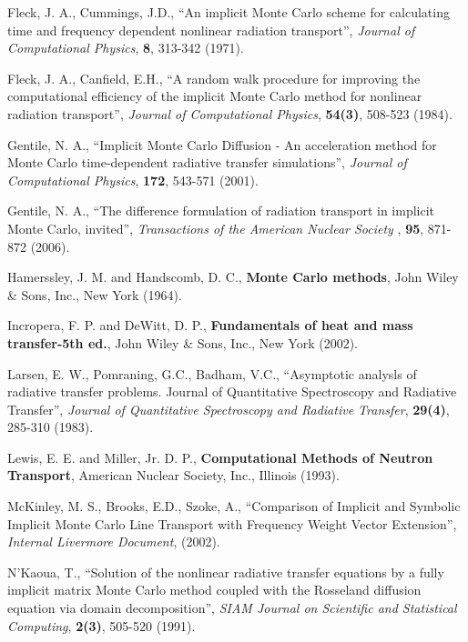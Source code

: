 \begin{thebibliography}{Wac 75}
 Fleck, J. A., Cummings, J.D., ``An implicit Monte Carlo scheme for calculating time and frequency dependent nonlinear radiation transport'',  \emph{Journal of Computational Physics}, \textbf{8}, 313-342 (1971).

 Fleck, J. A., Canfield, E.H., ``A random walk procedure for improving the computational efficiency of the implicit Monte Carlo method for nonlinear radiation transport'', \emph{Journal of Computational Physics}, \textbf{54(3)}, 508-523 (1984).
	

 Gentile, N. A., ``Implicit Monte Carlo Diffusion - An acceleration method for Monte Carlo time-dependent radiative transfer simulations'', 
	\emph{Journal of Computational Physics},
	\textbf{172}, 543-571 (2001).	

 Gentile, N. A., ``The difference formulation of radiation transport in implicit Monte Carlo, invited'', 
	\emph{Transactions of the American Nuclear Society },
	\textbf{95}, 871-872 (2006).

 Hamerssley, J. M. and Handscomb, D. C., \textbf{Monte Carlo methods}, John Wiley \& Sons, Inc., New York (1964).
	
 Incropera, F. P. and DeWitt, D. P., \textbf{Fundamentals of heat and mass transfer-5th ed.}, John Wiley \& Sons, Inc., New York (2002). 


 Larsen, E. W., Pomraning, G.C., Badham, V.C., ``Asymptotic analysls of radiative transfer problems. Journal of Quantitative Spectroscopy and Radiative Transfer'',  \emph{Journal of Quantitative Spectroscopy and Radiative Transfer}, \textbf{29(4)}, 
	285-310 (1983).

 Lewis, E. E. and Miller, Jr. D. P., \textbf{Computational Methods of Neutron Transport}, American Nuclear Society, Inc., Illinois (1993). 


 McKinley, M. S., Brooks, E.D., Szoke, A., ``Comparison of Implicit and Symbolic Implicit Monte Carlo Line Transport with Frequency Weight Vector Extension'', \emph{Internal Livermore Document}, (2002). 	
	
 N'Kaoua, T., ``Solution of the nonlinear radiative transfer equations by a fully implicit matrix Monte Carlo method coupled with the Rosseland diffusion equation via domain decomposition'',
	\emph{SIAM Journal on Scientific and Statistical Computing}, \textbf{2(3)}, 505-520 (1991).
	

\end{thebibliography}
